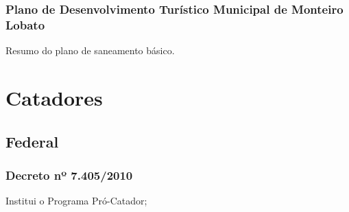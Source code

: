 \begin{subapend}
\begin{subsubapend}
		\subsubsection{Plano de Desenvolvimento Turístico Municipal de Monteiro Lobato}
		Resumo do plano de saneamento básico.
	\end{subsubapend}
\end{subapend}

\section{Catadores}


\begin{subapend}
	\subsection{Federal}
	\begin{subsubapend}
		\item \subsubsection{Decreto nº 7.405/2010}
		Institui o Programa Pró-Catador;
	\end{subsubapend}
\end{subapend}

